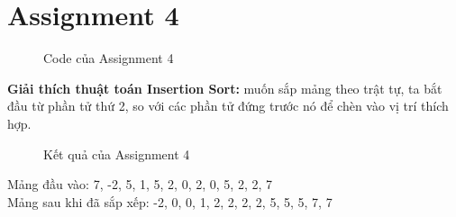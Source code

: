\documentclass[a4paper,12pt]{article}
\begin{document}
\section{Assignment 4}
\begin{figure}[!h]
	\centering
	\caption{Code của Assignment 4} 
\end{figure}
\noindent
\textbf{Giải thích thuật toán Insertion Sort: } muốn sắp mảng theo trật tự, ta bắt đầu từ phần tử thứ 2, so với các phần tử đứng trước nó để chèn vào vị trí thích hợp.
\clearpage
\begin{figure}[!h]
	\centerline{}
	\caption{Kết quả của Assignment 4}
	\label{fig:ass4}
\end{figure}
\noindent
Mảng đầu vào: 7, -2, 5, 1, 5, 2, 0, 2, 0, 5, 2, 2, 7 \\
Mảng sau khi đã sắp xếp: -2, 0, 0, 1, 2, 2, 2, 2, 5, 5, 5, 7, 7 
\end{document}
